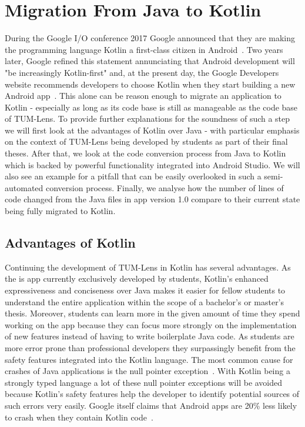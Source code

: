 \documentclass[
			   fontsize=11pt,
               paper=a4,
               bibliography=totoc,
               idxtotoc,
               headsepline,
               footsepline,
               footinclude=false,
               BCOR=12mm,
               DIV=13,
               openany,   %
               ]
               {scrbook}
\begin{document}
\chapter{Migration From Java to Kotlin}

During the Google I/O conference 2017 Google announced that they are making the programming language Kotlin a first-class citizen in Android~\cite{googleIO17}. Two years later, Google refined this statement annunciating that Android development will "be increasingly Kotlin-first" and, at the present day, the Google Developers website recommends developers to choose Kotlin when they start building a new Android app~\cite{kotlinFirst}. This alone can be reason enough to migrate an application to Kotlin - especially as long as its code base is still as manageable as the code base of TUM-Lens. To provide further explanations for the soundness of such a step we will first look at the advantages of Kotlin over Java - with particular emphasis on the context of TUM-Lens being developed by students as part of their final theses. After that, we look at the code conversion process from Java to Kotlin which is backed by powerful functionality integrated into Android Studio. We will also see an example for a pitfall that can be easily overlooked in such a semi-automated conversion process. Finally, we analyse how the number of lines of code changed from the Java files in app version 1.0 compare to their current state being fully migrated to Kotlin.

\section{Advantages of Kotlin}
Continuing the development of TUM-Lens in Kotlin has several advantages. As the is app currently exclusively developed by students, Kotlin's enhanced expressiveness and conciseness over Java makes it easier for fellow students to understand the entire application within the scope of a bachelor's or master's thesis. Moreover, students can learn more in the given amount of time they spend working on the app because they can focus more strongly on the implementation of new features instead of having to write boilerplate Java code. As students are more error prone than professional developers they surpassingly benefit from the safety features integrated into the Kotlin language. The most common cause for crashes of Java applications is the null pointer exception~\cite{nullPointerSamebug, nullPointerOverops}. With Kotlin being a strongly typed language a lot of these null pointer exceptions will be avoided because Kotlin's safety features help the developer to identify potential sources of such errors very easily. Google itself claims that Android apps are 20\% less likely to crash when they contain Kotlin code~\cite{kotlinFirst}.
\end{document}
